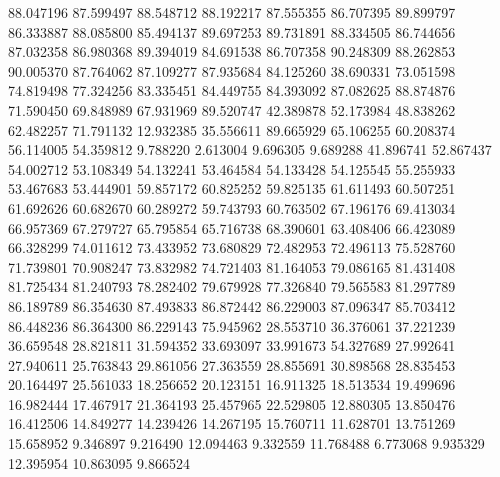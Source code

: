 88.047196
87.599497
88.548712
88.192217
87.555355
86.707395
89.899797
86.333887
88.085800
85.494137
89.697253
89.731891
88.334505
86.744656
87.032358
86.980368
89.394019
84.691538
86.707358
90.248309
88.262853
90.005370
87.764062
87.109277
87.935684
84.125260
38.690331
73.051598
74.819498
77.324256
83.335451
84.449755
84.393092
87.082625
88.874876
71.590450
69.848989
67.931969
89.520747
42.389878
52.173984
48.838262
62.482257
71.791132
12.932385
35.556611
89.665929
65.106255
60.208374
56.114005
54.359812
9.788220
2.613004
9.696305
9.689288
41.896741
52.867437
54.002712
53.108349
54.132241
53.464584
54.133428
54.125545
55.255933
53.467683
53.444901
59.857172
60.825252
59.825135
61.611493
60.507251
61.692626
60.682670
60.289272
59.743793
60.763502
67.196176
69.413034
66.957369
67.279727
65.795854
65.716738
68.390601
63.408406
66.423089
66.328299
74.011612
73.433952
73.680829
72.482953
72.496113
75.528760
71.739801
70.908247
73.832982
74.721403
81.164053
79.086165
81.431408
81.725434
81.240793
78.282402
79.679928
77.326840
79.565583
81.297789
86.189789
86.354630
87.493833
86.872442
86.229003
87.096347
85.703412
86.448236
86.364300
86.229143
75.945962
28.553710
36.376061
37.221239
36.659548
28.821811
31.594352
33.693097
33.991673
54.327689
27.992641
27.940611
25.763843
29.861056
27.363559
28.855691
30.898568
28.835453
20.164497
25.561033
18.256652
20.123151
16.911325
18.513534
19.499696
16.982444
17.467917
21.364193
25.457965
22.529805
12.880305
13.850476
16.412506
14.849277
14.239426
14.267195
15.760711
11.628701
13.751269
15.658952
9.346897
9.216490
12.094463
9.332559
11.768488
6.773068
9.935329
12.395954
10.863095
9.866524
